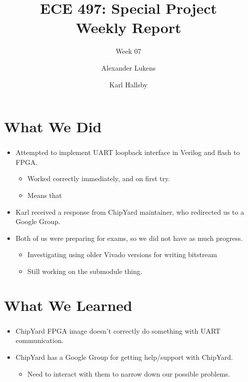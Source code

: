 \documentclass{../weeklyslides}
\title[Weekly Report]{ECE 497: Special Project \\ Weekly Report}
\subtitle{Week 07}
\author{Alexander Lukens \and Karl Hallsby}
\institute{Illinois Institute of Technology}
\date{\DTMdisplaydate{2021}{3}{11}{-1}}
\begin{document}
\nocite{chipyard}

\begin{frame}
  \titlepage{}
\end{frame}

\section{What We Did}\label{sec:What_We_Did}
\begin{frame}
  \frametitle{}
  \begin{itemize}
  \item Attempted to implement UART loopback interface in Verilog and flash to FPGA.\@
    \begin{itemize}
    \item Worked correctly immediately, and on first try.
    \item Means that
    \end{itemize}
  \item Karl received a response from ChipYard maintainer, who redirected us to a Google Group.
  \item Both of us were preparing for exams, so we did not have as much progress.
    \begin{itemize}
    \item Investigating using older Vivado versions for writing bitstream
    \item Still working on the submodule thing.
    \end{itemize}
  \end{itemize}
\end{frame}

\section{What We Learned}\label{sec:What_We_Learned}
\begin{frame}
  \frametitle{}
  \begin{itemize}
  \item ChipYard FPGA image doesn't correctly do something with UART communication.
  \item ChipYard has a Google Group for getting help/support with ChipYard.
    \begin{itemize}
    \item Need to interact with them to narrow down our possible problems.
    \end{itemize}
  \end{itemize}
\end{frame}
\end{document}
